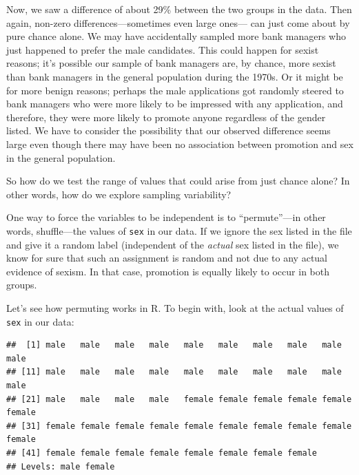 \documentclass[
]{book}
\newenvironment{Shaded}{\begin{snugshade}}{\end{snugshade}}
\newcommand{\NormalTok}[1]{#1}
\newcommand{\SpecialCharTok}[1]{\textcolor[rgb]{0.00,0.00,0.00}{#1}}
\begin{document}
Now, we saw a difference of about 29\% between the two groups in the data. Then again, non-zero differences---sometimes even large ones--- can just come about by pure chance alone. We may have accidentally sampled more bank managers who just happened to prefer the male candidates. This could happen for sexist reasons; it's possible our sample of bank managers are, by chance, more sexist than bank managers in the general population during the 1970s. Or it might be for more benign reasons; perhaps the male applications got randomly steered to bank managers who were more likely to be impressed with any application, and therefore, they were more likely to promote anyone regardless of the gender listed. We have to consider the possibility that our observed difference seems large even though there may have been no association between promotion and sex in the general population.

So how do we test the range of values that could arise from just chance alone? In other words, how do we explore sampling variability?

One way to force the variables to be independent is to ``permute''---in other words, shuffle---the values of \texttt{sex} in our data. If we ignore the sex listed in the file and give it a random label (independent of the \emph{actual} sex listed in the file), we know for sure that such an assignment is random and not due to any actual evidence of sexism. In that case, promotion is equally likely to occur in both groups.

Let's see how permuting works in R. To begin with, look at the actual values of \texttt{sex} in our data:

\begin{Shaded}
\end{Shaded}

\begin{verbatim}
##  [1] male   male   male   male   male   male   male   male   male   male  
## [11] male   male   male   male   male   male   male   male   male   male  
## [21] male   male   male   male   female female female female female female
## [31] female female female female female female female female female female
## [41] female female female female female female female female
## Levels: male female
\end{verbatim}
\end{document}
